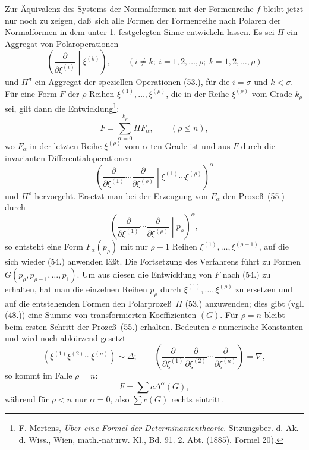 \documentclass[11pt]{article}
\begin{document}
Zur \"Aquivalenz des Systems der Normalformen mit der Formenreihe $f$ bleibt jetzt nur noch zu zeigen, da\ss\ sich alle Formen der Formenreihe nach Polaren der Normalformen in dem unter 1. festgelegten Sinne entwickeln lassen. Es sei $\Pi$ ein Aggregat von Polaroperationen
\begin{equation}
 \left(\frac{\partial}{\partial\xi^{(i)}}\middle|\xi^{(k)}\right),
 \qquad (i\ne k;\ i=1,2,\ldots,\rho;\ k=1,2,\ldots,\rho)
\tag{53}
\end{equation}
und $\Pi^\sigma$ ein Aggregat der speziellen Operationen (53.), f\"ur die $i=\sigma$ und $k<\sigma$. F\"ur eine Form $F$ der $\rho$ Reihen $\xi^{(1)},\ldots,\xi^{(\rho)}$, die in der Reihe $\xi^{(\rho)}$ vom Grade $k_\rho$ sei, gilt dann die Entwicklung\footnote{F. Mertens, \emph{\"Uber eine Formel der Determinantentheorie}. Sitzungsber. d. Ak. d. Wiss., Wien, math.-naturw. Kl., Bd. 91. 2. Abt. (1885). Formel 20).}:
\begin{equation}
 F=\sum_{\alpha=0}^{k_\rho}\Pi F_\alpha,
 \qquad(\rho\le n),
\tag{54}
\end{equation}
wo $F_\alpha$ in der letzten Reihe $\xi^{(\rho)}$ vom $\alpha$-ten Grade ist und aus $F$ durch die invarianten Differentialoperationen
\begin{equation}
 \left(\frac{\partial}{\partial\xi^{(1)}}\cdots\frac{\partial}{\partial\xi^{(\rho)}}\middle|\xi^{(1)}\cdots\xi^{(\rho)}\right)^\alpha
\tag{55}
\end{equation}
und $\Pi^\rho$ hervorgeht. Ersetzt man bei der Erzeugung von $F_\alpha$ den Proze\ss\ (55.) durch
\begin{equation}
 \left(\frac{\partial}{\partial\xi^{(1)}}\cdots\frac{\partial}{\partial\xi^{(\rho)}}\middle|p_\rho\right)^\alpha,
\tag{56}
\end{equation}
so entsteht eine Form $F_\alpha(p_\rho)$ mit nur $\rho-1$ Reihen $\xi^{(1)},\ldots,\xi^{(\rho-1)}$, auf die sich wieder (54.) anwenden l\"a\ss t. Die Fortsetzung des Verfahrens f\"uhrt zu Formen $G(p_\rho,p_{\rho-1},\ldots,p_1)$. Um aus diesen die Entwicklung von $F$ nach (54.) zu erhalten, hat man die einzelnen Reihen $p_\rho$ durch $\xi^{(1)},\ldots,\xi^{(\rho)}$ zu ersetzen und auf die entstehenden Formen den Polarproze\ss\ $\Pi$ (53.) anzuwenden; dies gibt (vgl. (48.)) eine Summe von transformierten Koeffizienten $(G)$. F\"ur $\rho=n$ bleibt beim ersten Schritt der Proze\ss\ (55.) erhalten. Bedeuten $c$ numerische Konstanten und wird noch abk\"urzend gesetzt
\begin{equation}
 (\xi^{(1)}\xi^{(2)}\cdots\xi^{(n)})\sim\Delta;
 \qquad
 \left(\frac{\partial}{\partial\xi^{(1)}}\frac{\partial}{\partial\xi^{(2)}}\cdots\frac{\partial}{\partial\xi^{(n)}}\right)=\nabla,
\tag{57}
\end{equation}
so kommt im Falle $\rho=n$:
\begin{equation}
 F=\sum c\Delta^\alpha(G),
\tag{58}
\end{equation}
w\"ahrend f\"ur $\rho<n$ nur $\alpha=0$, also $\sum c(G)$ rechts eintritt.
\end{document}
